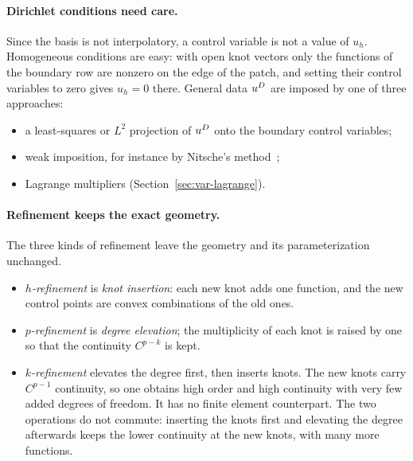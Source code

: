 \paragraph{Dirichlet conditions need care.}
%
Since the basis is not interpolatory, a control variable is not a value of
$u_h$. Homogeneous conditions are easy: with open knot vectors only the
functions of the boundary row are nonzero on the edge of the patch, and
setting their control variables to zero gives $u_h=0$ there. General data
$u^{D}$ are imposed by one of three approaches:
\begin{itemize}
\item a least-squares or $L^2$ projection of $u^{D}$ onto the boundary control
variables;
\item weak imposition, for instance by Nitsche's method~\cite{Nitsche1971};
\item Lagrange multipliers (Section~\ref{sec:var-lagrange}).
\end{itemize}

\paragraph{Refinement keeps the exact geometry.}
%
The three kinds of refinement leave the geometry and its parameterization
unchanged.
\begin{itemize}
\item \emph{$h$-refinement} is \emph{knot insertion}: each new knot adds one
function, and the new control points are convex combinations of the old
ones.
\item \emph{$p$-refinement} is \emph{degree elevation}; the multiplicity of
each knot is raised by one so that the continuity $C^{p-k}$ is kept.
\item \emph{$k$-refinement} elevates the degree first, then inserts knots.
The new knots carry $C^{p-1}$ continuity, so one obtains high order and high
continuity with very few added degrees of freedom. It has no finite element
counterpart. The two operations do not commute: inserting the knots first
and elevating the degree afterwards keeps the lower continuity at the new
knots, with many more functions.
\end{itemize}

